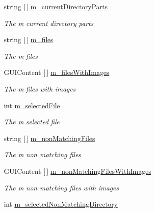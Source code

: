 \begin{DoxyCompactItemize}
string \mbox{[}$\,$\mbox{]} \hyperlink{class_lerp2_a_p_i_editor_1_1_utility_1_1_file_browser_editor_a50d6f522e6cd0d449443227f72522322}{m\+\_\+current\+Directory\+Parts}
\begin{DoxyCompactList}\small\item\em The m current directory parts \end{DoxyCompactList}\item 
string \mbox{[}$\,$\mbox{]} \hyperlink{class_lerp2_a_p_i_editor_1_1_utility_1_1_file_browser_editor_ad0c47a19cb9e43713f7d30774d453216}{m\+\_\+files}
\begin{DoxyCompactList}\small\item\em The m files \end{DoxyCompactList}\item 
G\+U\+I\+Content \mbox{[}$\,$\mbox{]} \hyperlink{class_lerp2_a_p_i_editor_1_1_utility_1_1_file_browser_editor_ae6872300c031ba328c9da3ac2dc769d6}{m\+\_\+files\+With\+Images}
\begin{DoxyCompactList}\small\item\em The m files with images \end{DoxyCompactList}\item 
int \hyperlink{class_lerp2_a_p_i_editor_1_1_utility_1_1_file_browser_editor_ab8f8ed6539a985340c52c0899ebc2eb4}{m\+\_\+selected\+File}
\begin{DoxyCompactList}\small\item\em The m selected file \end{DoxyCompactList}\item 
string \mbox{[}$\,$\mbox{]} \hyperlink{class_lerp2_a_p_i_editor_1_1_utility_1_1_file_browser_editor_a5b3a9803b8710bad6139e26143165291}{m\+\_\+non\+Matching\+Files}
\begin{DoxyCompactList}\small\item\em The m non matching files \end{DoxyCompactList}\item 
G\+U\+I\+Content \mbox{[}$\,$\mbox{]} \hyperlink{class_lerp2_a_p_i_editor_1_1_utility_1_1_file_browser_editor_ad76921c820a849fc9863f1e4fd5db099}{m\+\_\+non\+Matching\+Files\+With\+Images}
\begin{DoxyCompactList}\small\item\em The m non matching files with images \end{DoxyCompactList}\item 
int \hyperlink{class_lerp2_a_p_i_editor_1_1_utility_1_1_file_browser_editor_a38ab8a064afeb744cfa9fca4fdb1b432}{m\+\_\+selected\+Non\+Matching\+Directory}

\end{DoxyCompactItemize}

